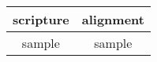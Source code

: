 \begin{center}
	\begin{tabular}{|c|c|}	\hline
		\textbf{scripture} 	& \textbf{alignment} 	\\ \hline
		sample				&  sample				\\ \hline
	\end{tabular}
\end{center}
